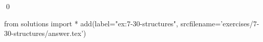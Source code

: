 
\begin{ex}
  \label{ex:7-30-structures}
  
  \qed
\end{ex}
\begin{python0}
from solutions import *
add(label="ex:7-30-structures",
    srcfilename='exercises/7-30-structures/answer.tex')
\end{python0}
